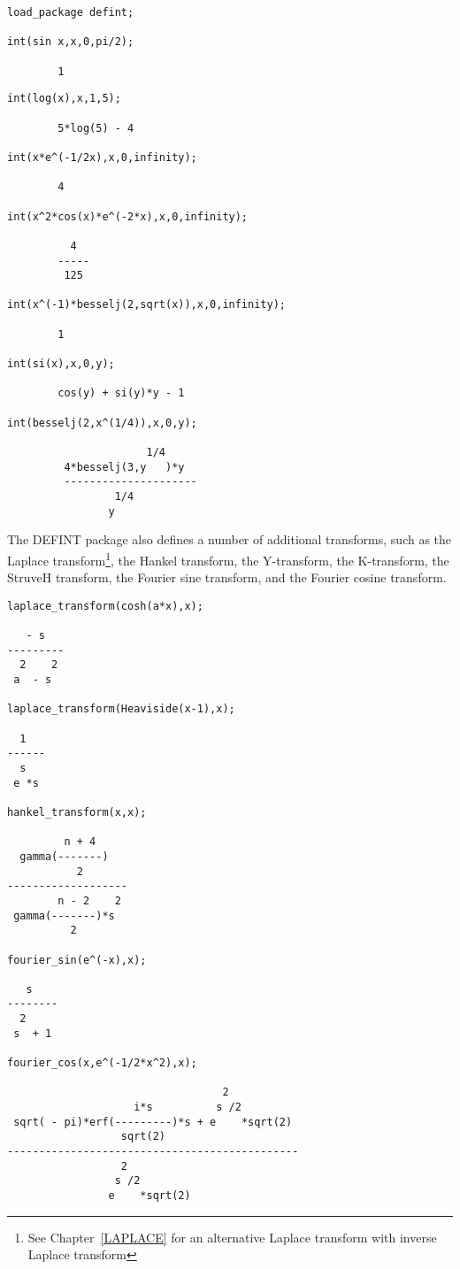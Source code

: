 \begin{verbatim}
load_package defint;

int(sin x,x,0,pi/2);

        1
\end{verbatim}
\newpage
\begin{verbatim}
int(log(x),x,1,5);

        5*log(5) - 4

int(x*e^(-1/2x),x,0,infinity);

        4

int(x^2*cos(x)*e^(-2*x),x,0,infinity);

          4
        -----
         125

int(x^(-1)*besselj(2,sqrt(x)),x,0,infinity);

        1

int(si(x),x,0,y);

        cos(y) + si(y)*y - 1

int(besselj(2,x^(1/4)),x,0,y);

                      1/4
         4*besselj(3,y   )*y
         ---------------------
                 1/4
                y
\end{verbatim}

The DEFINT package also defines a number of additional transforms,
such as the Laplace transform\footnote{See
Chapter~\ref{LAPLACE} for an alternative Laplace transform with
inverse Laplace transform}, the Hankel
transform, the Y-transform,
the K-transform, the StruveH
transform, the Fourier sine
transform, and the Fourier cosine
transform.

\begin{verbatim}
laplace_transform(cosh(a*x),x);

   - s
---------
  2    2
 a  - s

laplace_transform(Heaviside(x-1),x);

  1
------
  s
 e *s

hankel_transform(x,x);

         n + 4
  gamma(-------)
           2
-------------------
        n - 2    2
 gamma(-------)*s
          2

fourier_sin(e^(-x),x);

   s
--------
  2
 s  + 1

fourier_cos(x,e^(-1/2*x^2),x);

                                  2
                    i*s          s /2
 sqrt( - pi)*erf(---------)*s + e    *sqrt(2)
                  sqrt(2)
----------------------------------------------
                  2
                 s /2
                e    *sqrt(2)

\end{verbatim}

